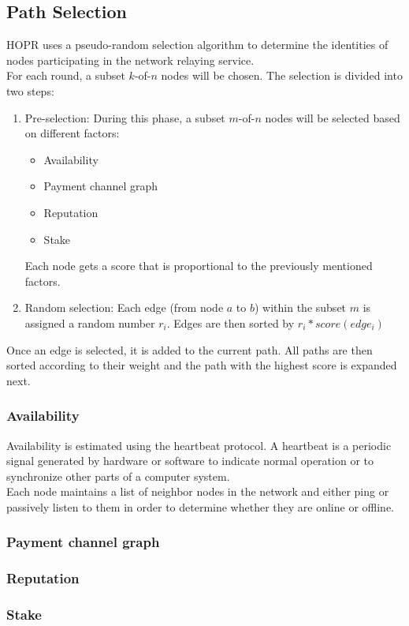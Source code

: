\subsection{Path Selection}
HOPR uses a pseudo-random selection algorithm to determine the identities of nodes participating in the network relaying service.
\\For each round, a subset $k$-of-$n$ nodes will be chosen. The selection is divided into two steps:
\begin{enumerate}
    \item Pre-selection: 
    During this phase, a subset $m$-of-$n$ nodes will be selected based on different factors:
    \begin{itemize}
        \item Availability
        \item Payment channel graph
        \item Reputation
        \item Stake
    \end{itemize}
Each node gets a score that is proportional to the previously mentioned factors.
\item Random selection: 
Each edge (from node $a$ to $b$) within the subset $m$ is assigned a random number $r_i$. Edges are then sorted by $r_i*score(edge_i)$
\end{enumerate}
Once an edge is selected, it is added to the current path. All paths are then sorted according to their weight and the path with the highest score is expanded next.


\subsubsection{Availability}
Availability is estimated using the heartbeat protocol. A heartbeat is a periodic signal generated by hardware or software to indicate normal operation or to synchronize other parts of a computer system.
\\ Each node maintains a list of neighbor nodes in the network and either ping or passively listen to them in order to determine whether they are online or offline.

\subsubsection{Payment channel graph}
\subsubsection{Reputation}
\subsubsection{Stake}











    
